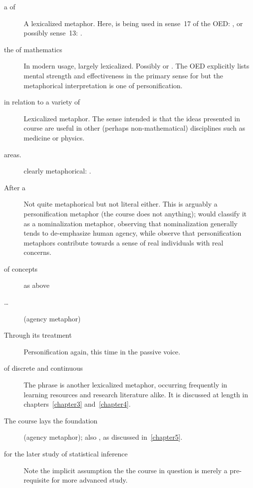 \begin{description}
\item[a  of]\qquad A lexicalized metaphor.  Here,
   is being used in sense~17 of the OED:
  , or possibly sense~13:
  .
\item[the  of mathematics]\qquad In modern usage,
  largely lexicalized.  Possibly  or
  .  The OED explicitly lists mental
  strength and effectiveness in the primary sense for 
  but the metaphorical interpretation is one of personification.
\item[in relation to a variety of ]\qquad
  Lexicalized metaphor.  The sense intended is that the ideas
  presented in course are useful in other (perhaps non-mathematical)
  disciplines such as medicine or physics.
\item[areas.]\qquad clearly metaphorical: .
\item[After a ]\qquad Not quite metaphorical but
  not literal either.  This is arguably a personification metaphor
  (the course does not  anything);
   would classify it as a nominalization metaphor,
  observing that nominalization generally tends to de-emphasize human
  agency, while  observe that personification
  metaphors contribute towards a sense of real individuals with real
  concerns.
\item[of  concepts]\qquad as above
\item[\ldots]\qquad (agency metaphor)
\item[Through its treatment]\qquad Personification again, this time in
  the passive voice.
\item[of discrete and continuous ]\qquad
  The phrase  is another lexicalized
  metaphor, occurring frequently in learning resources and research
  literature alike.  It is discussed at length in
  chapters~\ref{chapter3} and~\ref{chapter4}.
\item[The course lays the foundation]\qquad (agency metaphor); also
  , as discussed in~\ref{chapter5}.
\item[for the later study of statistical inference]\qquad Note the
  implicit assumption the the course in question is merely a
  pre-requisite for more advanced study.
\end{description}

